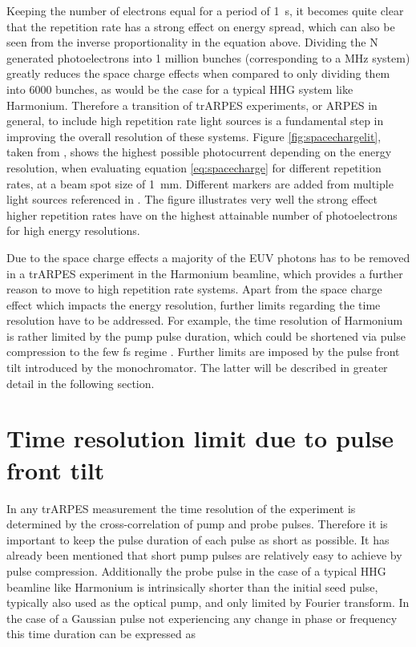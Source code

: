 Keeping the number of electrons equal for a period of \qty{1}{\second}, it becomes quite clear that the repetition rate has a strong effect on energy spread, which can also be seen from the inverse proportionality in the equation above.
Dividing the N generated photoelectrons into 1 million bunches (corresponding to a \unit{\mega\hertz} system) greatly reduces the space charge effects when compared to only dividing them into 6000 bunches, as would be the case for a typical HHG system like Harmonium.
Therefore a transition of trARPES experiments, or ARPES in general, to include high repetition rate light sources is a fundamental step in improving the overall resolution of these systems.
Figure \ref{fig:spacechargelit}, taken from \cite{corder_ultrafast_2018}, shows the highest possible photocurrent depending on the energy resolution, when evaluating equation \ref{eq:spacecharge} for different repetition rates, at a beam spot size of \qty{1}{\milli\meter}.
Different markers are added from multiple light sources referenced in \cite{corder_ultrafast_2018}.
The figure illustrates very well the strong effect higher repetition rates have on the highest attainable number of photoelectrons for high energy resolutions.

Due to the space charge effects a majority of the EUV photons has to be removed in a trARPES experiment in the Harmonium beamline, which provides a further reason to move to high repetition rate systems.
Apart from the space charge effect which impacts the energy resolution, further limits regarding the time resolution have to be addressed.
For example, the time resolution of Harmonium is rather limited by the pump pulse duration, which could be shortened via pulse compression to the few \unit{\femto\second} regime \cite{nisoli_compression_1997}.
Further limits are imposed by the pulse front tilt introduced by the monochromator.
The latter will be described in greater detail in the following section.
	
\section{Time resolution limit due to pulse front tilt}

In any trARPES measurement the time resolution of the experiment is determined by the cross-correlation of pump and probe pulses.
Therefore it is important to keep the pulse duration of each pulse as short as possible.
It has already been mentioned that short pump pulses are relatively easy to achieve by pulse compression.
Additionally the probe pulse in the case of a typical HHG beamline like Harmonium is intrinsically shorter than the initial seed pulse, typically also used as the optical pump, and only limited by Fourier transform.
In the case of a Gaussian pulse not experiencing any change in phase or frequency this time duration can be expressed as

